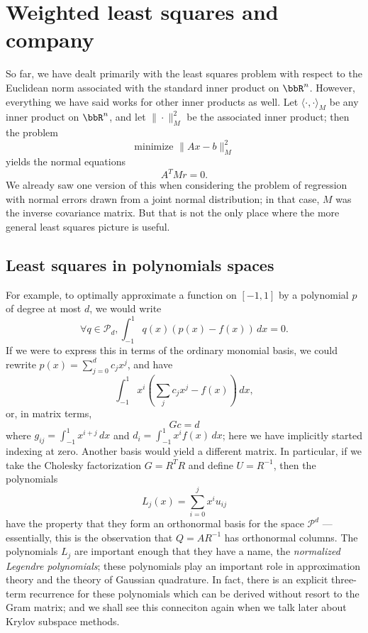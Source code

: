 \section{Weighted least squares and company}

So far, we have dealt primarily with the least squares problem
with respect to the Euclidean norm associated with the standard
inner product on $\bbR^n$.  However, everything
we have said works for other inner products as well.
Let $\langle \cdot, \cdot \rangle_M$ be any inner product on
$\bbR^n$, and let $\|\cdot\|_M^2$ be the associated inner product;
then the problem
\[
  \mbox{minimize } \|Ax-b\|_M^2
\]
yields the normal equations
\[
  A^T M r = 0.
\]
We already saw one version of this when considering the problem of
regression with normal errors drawn from a joint normal distribution;
in that case, $M$ was the inverse covariance matrix.  But that is not
the only place where the more general least squares picture is useful.

\subsection{Least squares in polynomials spaces}

For example, to optimally approximate a function on $[-1,1]$ by a
polynomial $p$ of degree at most $d$, we would write
\[
  \forall q \in \mathcal{P}_{d}, \int_{-1}^1 q(x) (p(x)-f(x)) \, dx = 0.
\]
If we were to express this in terms of the ordinary monomial basis,
we could rewrite $p(x) = \sum_{j=0}^d c_j x^j$, and have
\[
  \int_{-1}^1 x^i \left( \sum_j c_j x^j - f(x) \right) \, dx,
\]
or, in matrix terms,
\[
  Gc = d
\]
where $g_{ij} = \int_{-1}^1 x^{i+j} \, dx$ and
$d_i = \int_{-1}^1 x^i f(x) \, dx$; here we have implicitly
started indexing at zero.  Another basis would yield a
different matrix.  In particular, if we take the Cholesky
factorization $G = R^T R$ and define $U = R^{-1}$, then the
polynomials
\[
  L_j(x) = \sum_{i=0}^j x^i u_{ij}
\]
have the property that they form an orthonormal basis for
the space $\mathcal{P}^d$ --- essentially, this is the
observation that $Q = A R^{-1}$ has orthonormal columns.
The polynomials $L_j$ are important enough that they have a name,
the {\em normalized Legendre polynomials}; these polynomials play
an important role in approximation theory and the theory of Gaussian
quadrature.  In fact, there is an explicit three-term recurrence for
these polynomials which can be derived without resort to the Gram
matrix; and we shall see this conneciton again when we talk later
about Krylov subspace methods.

